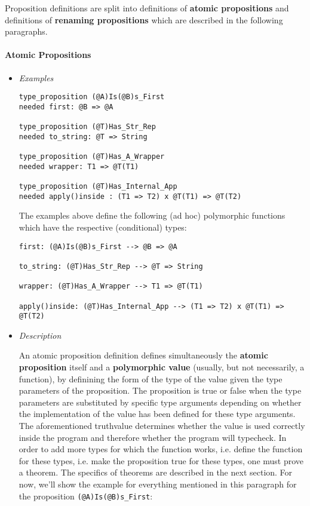 \documentclass{article}
\begin{document}
Proposition definitions are split into definitions of \textbf{atomic
propositions} and definitions of \textbf{renaming propositions} which are
described in the following paragraphs.

\paragraph{Atomic Propositions}

\begin{itemize}
\item \textit{Examples}
\begin{verbatim}
type_proposition (@A)Is(@B)s_First
needed first: @B => @A

type_proposition (@T)Has_Str_Rep
needed to_string: @T => String

type_proposition (@T)Has_A_Wrapper
needed wrapper: T1 => @T(T1)

type_proposition (@T)Has_Internal_App
needed apply()inside : (T1 => T2) x @T(T1) => @T(T2)
\end{verbatim}
The examples above define the following (ad hoc) polymorphic functions which
have the respective (conditional) types:
\begin{verbatim}
first: (@A)Is(@B)s_First --> @B => @A

to_string: (@T)Has_Str_Rep --> @T => String

wrapper: (@T)Has_A_Wrapper --> T1 => @T(T1)

apply()inside: (@T)Has_Internal_App --> (T1 => T2) x @T(T1) => @T(T2)
\end{verbatim}

\newpage

\item \textit{Description}

An atomic proposition definition defines simultaneously the \textbf{atomic
proposition} itself and a \textbf{polymorphic value} (usually, but not
necessarily, a function), by definining the form of the type of the value given
the type parameters of the proposition. The proposition is true or false when
the type parameters are substituted by specific type arguments depending on
whether the implementation of the value has been defined for these type
arguments. The aforementioned truthvalue determines whether the value is used
correctly inside the program and therefore whether the program will typecheck.
In order to add more types for which the function works, i.e.  define the
function for these types, i.e. make the proposition true for these types, one
must prove a theorem. The specifics of theorems are described in the next
section. For now, we'll show the example for everything mentioned in this
paragraph for the proposition \texttt{(@A)Is(@B)s_First}:


\end{itemize}
\end{document}
